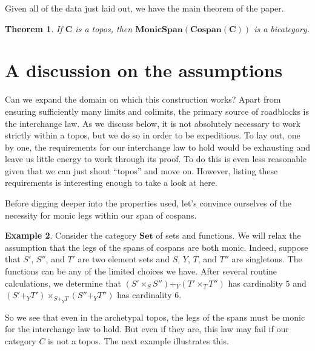 \documentclass[11pt]{amsart}
\newcommand{\cat}[1]{\mathbf{#1}}
\newtheorem{thm}{Theorem}[section]
\theoremstyle{remark}
\theoremstyle{definition}
\newtheorem{ex}[thm]{Example}
\begin{document}
Given all of the data just laid out, we have the main theorem of the paper.

\begin{thm}
	If $\cat{C}$ is a topos, then $\cat{MonicSpan(Cospan(C))}$ is a bicategory.
\end{thm}
%
%
%
%
%
%
%
%
\section{A discussion on the assumptions}  %
\label{sec.Disc on Assump}
%

Can we expand the domain on which this construction works? Apart from ensuring sufficiently many limits and colimits, the primary source of roadblocks is the interchange law. As we discuss below, it is not absolutely necessary to work strictly within a topos, but we do so in order to be expeditious.  To lay out, one by one, the requirements for our interchange law to hold would be exhausting and leave us little energy to work through its proof. To do this is even less reasonable given that we can just shout ``topos'' and move on.   However, listing these requirements is interesting enough to take a look at here.  
%
%
%
%
%

Before digging deeper into the properties used, let's convince ourselves of the necessity for monic legs within our span of cospans.

\begin{ex}
	Consider the category $\cat{Set}$ of sets and functions. We will relax the assumption that the legs of the spans of cospans are both monic.  Indeed, suppose that $S'$, $S''$, and $T'$ are two element sets and $S$, $Y$, $T$, and $T''$ are singletons.  The functions can be any of the limited choices we have.  After several routine calculations, we determine that $(S' \times_S S'') +_Y (T' \times_T T'')$ has cardinality $5$ and $(S' +_Y T') \times_{S+_YT} (S''+_YT'')$ has cardinality $6$. 
\end{ex}

So we see that even in the archetypal topos, the legs of the spans must be monic for the interchange law to hold. But even if they are, this law may fail if our category $C$ is not a topos. The next example illustrates this.
\end{document}

